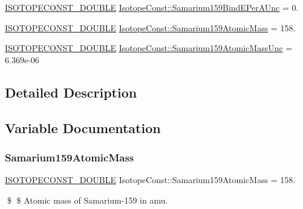 \begin{DoxyCompactItemize}
\mbox{\hyperlink{group___isotope_const-_macros_ga8f45a7272ce02c0b4c65c44636ed719a}{I\+S\+O\+T\+O\+P\+E\+C\+O\+N\+S\+T\+\_\+\+D\+O\+U\+B\+LE}} \mbox{\hyperlink{group___isotope_const-_samarium-_sm159_gabd68f35c8ebe755335bb7821d7a69344}{Isotope\+Const\+::\+Samarium159\+Bind\+E\+Per\+A\+Unc}} = 0.
\item 
\mbox{\hyperlink{group___isotope_const-_macros_ga8f45a7272ce02c0b4c65c44636ed719a}{I\+S\+O\+T\+O\+P\+E\+C\+O\+N\+S\+T\+\_\+\+D\+O\+U\+B\+LE}} \mbox{\hyperlink{group___isotope_const-_samarium-_sm159_gac835e052c333f7c2cde3ee467f6f74f7}{Isotope\+Const\+::\+Samarium159\+Atomic\+Mass}} = 158.
\item 
\mbox{\hyperlink{group___isotope_const-_macros_ga8f45a7272ce02c0b4c65c44636ed719a}{I\+S\+O\+T\+O\+P\+E\+C\+O\+N\+S\+T\+\_\+\+D\+O\+U\+B\+LE}} \mbox{\hyperlink{group___isotope_const-_samarium-_sm159_ga8945c8eb2a0f4d35067b474bf9ec2460}{Isotope\+Const\+::\+Samarium159\+Atomic\+Mass\+Unc}} = 6.\+369e-\/06
\end{DoxyCompactItemize}


\subsection{Detailed Description}


\subsection{Variable Documentation}
\mbox{\label{group___isotope_const-_samarium-_sm159_gac835e052c333f7c2cde3ee467f6f74f7}} 
\subsubsection{\texorpdfstring{Samarium159\+Atomic\+Mass}{Samarium159AtomicMass}}
{\footnotesize\ttfamily \mbox{\hyperlink{group___isotope_const-_macros_ga8f45a7272ce02c0b4c65c44636ed719a}{I\+S\+O\+T\+O\+P\+E\+C\+O\+N\+S\+T\+\_\+\+D\+O\+U\+B\+LE}} Isotope\+Const\+::\+Samarium159\+Atomic\+Mass = 158.}

\$ \$ Atomic mass of Samarium-\/159 in amu. \mbox{\label{group___isotope_const-_samarium-_sm159_ga8945c8eb2a0f4d35067b474bf9ec2460}} 
